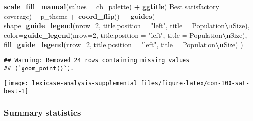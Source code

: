 \documentclass[
]{book}
\newenvironment{Shaded}{\begin{snugshade}}{\end{snugshade}}
\newcommand{\AttributeTok}[1]{\textcolor[rgb]{0.13,0.29,0.53}{#1}}
\newcommand{\DecValTok}[1]{\textcolor[rgb]{0.00,0.00,0.81}{#1}}
\newcommand{\FunctionTok}[1]{\textcolor[rgb]{0.13,0.29,0.53}{\textbf{#1}}}
\newcommand{\NormalTok}[1]{#1}
\newcommand{\SpecialCharTok}[1]{\textcolor[rgb]{0.81,0.36,0.00}{\textbf{#1}}}
\newcommand{\StringTok}[1]{\textcolor[rgb]{0.31,0.60,0.02}{#1}}
\begin{document}
\begin{Shaded}
\begin{Highlighting}[]
  \FunctionTok{scale\_fill\_manual}\NormalTok{(}\AttributeTok{values =}\NormalTok{ cb\_palette) }\SpecialCharTok{+}
  \FunctionTok{ggtitle}\NormalTok{(}\StringTok{\textquotesingle{}  Best satisfactory coverage\textquotesingle{}}\NormalTok{)}\SpecialCharTok{+}
\NormalTok{  p\_theme }\SpecialCharTok{+} \FunctionTok{coord\_flip}\NormalTok{() }\SpecialCharTok{+}
  \FunctionTok{guides}\NormalTok{(}
    \AttributeTok{shape=}\FunctionTok{guide\_legend}\NormalTok{(}\AttributeTok{nrow=}\DecValTok{2}\NormalTok{, }\AttributeTok{title.position =} \StringTok{"left"}\NormalTok{, }\AttributeTok{title =} \StringTok{\textquotesingle{}Population}\SpecialCharTok{\textbackslash{}n}\StringTok{Size\textquotesingle{}}\NormalTok{),}
    \AttributeTok{color=}\FunctionTok{guide\_legend}\NormalTok{(}\AttributeTok{nrow=}\DecValTok{2}\NormalTok{, }\AttributeTok{title.position =} \StringTok{"left"}\NormalTok{, }\AttributeTok{title =} \StringTok{\textquotesingle{}Population}\SpecialCharTok{\textbackslash{}n}\StringTok{Size\textquotesingle{}}\NormalTok{),}
    \AttributeTok{fill=}\FunctionTok{guide\_legend}\NormalTok{(}\AttributeTok{nrow=}\DecValTok{2}\NormalTok{, }\AttributeTok{title.position =} \StringTok{"left"}\NormalTok{, }\AttributeTok{title =} \StringTok{\textquotesingle{}Population}\SpecialCharTok{\textbackslash{}n}\StringTok{Size\textquotesingle{}}\NormalTok{)}
\NormalTok{  )}
\end{Highlighting}
\end{Shaded}

\begin{verbatim}
## Warning: Removed 24 rows containing missing values
## (`geom_point()`).
\end{verbatim}

\texttt{[image: lexicase-analysis-supplemental\_files/figure-latex/con-100-sat-best-1]}

\hypertarget{summary-statistics-3}{%
\subsubsection{Summary statistics}\label{summary-statistics-3}}
\end{document}
